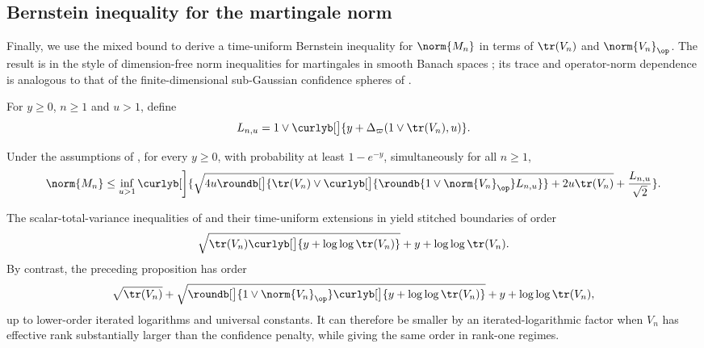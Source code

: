 \documentclass[11pt]{article}
\let\cref\zcref
\begin{document}
\subsection{Bernstein inequality for the martingale norm}\label{sec:ordinary-norm-bounds}

Finally, we use the mixed bound to derive a time-uniform Bernstein inequality for $\norm{M_n}$ in terms of $\tr(V_n)$ and $\norm{V_n}_{\op}$. The result is in the style of dimension-free norm inequalities for martingales in smooth Banach spaces \citep{pinelis1994optimum}; its trace and operator-norm dependence is analogous to that of the finite-dimensional sub-Gaussian confidence spheres of \citet{chugg2025confidencespheres}.

For $y\geq0$, $n\geq1$ and $u>1$, define
\[
  L_{n,u}=1\vee\curlyb[\big]{y+\Delta_\varpi(1\vee\tr(V_n),u)}.
\]

\begin{proposition}\label{prop:covariance-sensitive-bernstein}
Under the assumptions of \cref{thm:mixed-rho-bennett}, for every $y\geq0$, with probability at least $1-e^{-y}$, simultaneously for all $n\geq1$,
\[
  \norm{M_n}\leq\inf_{u>1}\curlyb[\bigg]{\sqrt{4u\roundb[\big]{\tr(V_n)\vee\curlyb[\big]{\roundb{1\vee\norm{V_n}_{\op}}L_{n,u}}}+2u\tr(V_n)}+\frac{L_{n,u}}{\sqrt2}}.
\]
\end{proposition}

The scalar-total-variance inequalities of \citet{pinelis1994optimum} and their time-uniform extensions in \citet{howard2020timeuniform} yield stitched boundaries of order
\[
  \sqrt{\tr(V_n)\curlyb[\big]{y+\log\log\tr(V_n)}}+y+\log\log\tr(V_n).
\]
By contrast, the preceding proposition has order
\[
  \sqrt{\tr(V_n)}+\sqrt{\roundb[\big]{1\vee\norm{V_n}_{\op}}\curlyb[\big]{y+\log\log\tr(V_n)}}+y+\log\log\tr(V_n),
\]
up to lower-order iterated logarithms and universal constants. It can therefore be smaller by an iterated-logarithmic factor when $V_n$ has effective rank substantially larger than the confidence penalty, while giving the same order in rank-one regimes.
\end{document}
